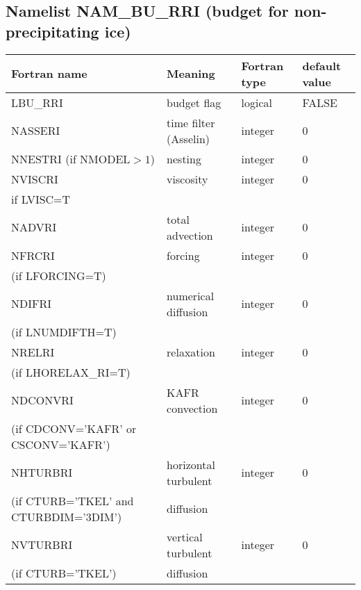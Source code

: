 \subsection{Namelist NAM\_BU\_RRI (budget for non-precipitating ice)}
\begin{longtable} {|p{}|p{}|>{\centering}p{}|p{}<{\centering}|}
\hline
Fortran name & Meaning & Fortran type & default value \\
\hline \hline
\endhead
LBU\_RRI & budget flag & logical & FALSE\index{LBU\_RRI!\innam{NAM\_BU\_RRI}} \\\hline
NASSERI  & time filter (Asselin)   & integer  &  0 \index{NASSERI!\innam{NAM\_BU\_RRI}} \\\hline
NNESTRI (if NMODEL$>1$) & nesting           & integer  &  0 \index{NNESTRI!\innam{NAM\_BU\_RRI}} \\\hline
NVISCRI  & viscosity         & integer  &  0 \index{NVISCRI!\innam{NAM\_BU\_RRI}}\\
if LVISC=T &  &   &   \\\hline
NADVRI   & total advection   & integer  &  0 \index{NADVRI!\innam{NAM\_BU\_RRI}}\\\hline
NFRCRI   & forcing           & integer  &  0 \index{NFRCRI!\innam{NAM\_BU\_RRI}} \\ \nopagebreak
(if LFORCING=T) &  &   &   \\\hline
NDIFRI   & numerical diffusion & integer  &  0 \index{NDIFRI!\innam{NAM\_BU\_RRI}} \\ \nopagebreak
(if LNUMDIFTH=T) &  &   &   \\\hline
NRELRI   & relaxation        & integer  &  0 \index{NRELRI!\innam{NAM\_BU\_RRI}}\\ \nopagebreak
(if LHORELAX\_RI=T) &  &   &   \\\hline
NDCONVRI & KAFR convection   & integer  &  0 \index{NDCONVRI!\innam{NAM\_BU\_RRI}} \\ \nopagebreak
(if CDCONV='KAFR' or CSCONV='KAFR') &  &   &   \\\hline
NHTURBRI & horizontal turbulent  & integer  &  0 \index{NHTURBRI!\innam{NAM\_BU\_RRI}}\\ \nopagebreak
(if CTURB='TKEL' and CTURBDIM='3DIM') &diffusion &   &  \\\hline
NVTURBRI & vertical turbulent  & integer  &  0 \index{NVTURBRI!\innam{NAM\_BU\_RRI}}\\ \nopagebreak
(if CTURB='TKEL') &diffusion &   &  \\\hline

\end{longtable}

